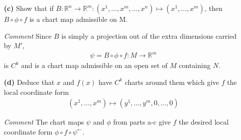 \documentclass[11pt]{article}
\begin{document}
\begin{itemize}
\item[\textbf{(c)}] Show that if $B\colon \mathbb{R}^n \rightarrow \mathbb{R}^m
  \colon (x^1,\ldots,x^m,\ldots,x^n) \mapsto (x^1,\ldots,x^m)$, then $B\circ
  \phi\circ f$ is a chart map admissible on M.
\item[\emph{Comment}] Since $B$ is simply a projection out of the extra
  dimensions carried by $M'$,
  \begin{align}
    \psi = B\circ  \phi\circ f \colon M \rightarrow \mathbb{R}^m
  \end{align}
  is $C^k$ and is a chart map admissible on an open set of $M$ containing $N$.

\item[\textbf{(d)}] Deduce that $x$ and $f(x)$ have $C^k$ charts around them
  which give $f$ the local coordinate form
  \begin{align}
    (x^1,\ldots,x^m) \mapsto (y^1,\ldots,y^m,0,\ldots,0)
  \end{align}
\item[\emph{Comment}] The chart maps $\psi$ and $\phi$ from parts a-c give $f$
  the desired local coordinate form $\phi \circ f \circ \psi^\leftarrow$.

\end{itemize}
\end{document}
